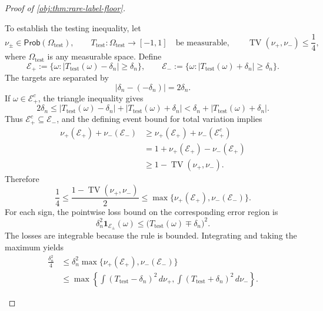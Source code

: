 \documentclass[11pt]{article}
\begin{document}
\begin{proof}[Proof of \cref{obj:thm:rare-label-floor}]
\begin{enumerate}
To establish the testing inequality, let
\[
\nu_\pm\in\mathsf{Prob}(\Omega_{\mathrm{test}}),
\qquad
T_{\mathrm{test}}:\Omega_{\mathrm{test}}\longrightarrow[-1,1]
\quad\text{be measurable},
\qquad
\operatorname{TV}(\nu_+,\nu_-)\le\frac14,
\]
where \(\Omega_{\mathrm{test}}\) is any measurable space. Define
\[
\mathcal E_+
:=
\{\omega:|T_{\mathrm{test}}(\omega)-\delta_n|\ge\delta_n\},
\qquad
\mathcal E_-
:=
\{\omega:|T_{\mathrm{test}}(\omega)+\delta_n|\ge\delta_n\}.
\]
The targets are separated by
\[
|\delta_n-(-\delta_n)|=2\delta_n.
\]
If \(\omega\in\mathcal E_+^c\), the triangle inequality gives
\[
2\delta_n
\le
|T_{\mathrm{test}}(\omega)-\delta_n|
+
|T_{\mathrm{test}}(\omega)+\delta_n|
<
\delta_n+|T_{\mathrm{test}}(\omega)+\delta_n|.
\]
Thus \(\mathcal E_+^c\subseteq\mathcal E_-\), and the defining event bound
for total variation implies
\[
\begin{aligned}
\nu_+(\mathcal E_+)+\nu_-(\mathcal E_-)
&\ge
\nu_+(\mathcal E_+)+\nu_-(\mathcal E_+^c)\\
&=
1+\nu_+(\mathcal E_+)-\nu_-(\mathcal E_+)\\
&\ge1-\operatorname{TV}(\nu_+,\nu_-).
\end{aligned}
\]
Therefore
\[
\frac14
\le
\frac{1-\operatorname{TV}(\nu_+,\nu_-)}2
\le
\max\{\nu_+(\mathcal E_+),\nu_-(\mathcal E_-)\}.
\]
For each sign, the pointwise loss bound on the corresponding error
region is
\[
\delta_n^2\mathbf1_{\mathcal E_\pm}(\omega)
\le
\bigl(T_{\mathrm{test}}(\omega)\mp\delta_n\bigr)^2.
\]
The losses are integrable because the rule is bounded. Integrating and
taking the maximum yields
\[
\begin{aligned}
\frac{\delta_n^2}{4}
&\le
\delta_n^2
\max\{\nu_+(\mathcal E_+),\nu_-(\mathcal E_-)\}\\
&\le
\max\left\{
\int (T_{\mathrm{test}}-\delta_n)^2\,d\nu_+,
\int (T_{\mathrm{test}}+\delta_n)^2\,d\nu_-
\right\}.
\end{aligned}
\]


\end{enumerate}
\end{proof}
\end{document}
